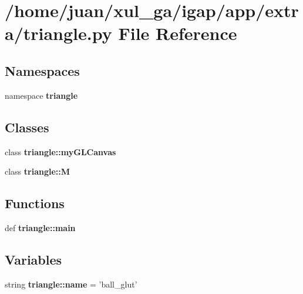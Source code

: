 \section{/home/juan/xul\_\-ga/igap/app/extra/triangle.py File Reference}
\label{triangle_8py}
\subsection*{Namespaces}
\begin{CompactItemize}
\item 
namespace {\bf triangle}
\end{CompactItemize}
\subsection*{Classes}
\begin{CompactItemize}
\item 
class {\bf triangle::myGLCanvas}
\item 
class {\bf triangle::M}
\end{CompactItemize}
\subsection*{Functions}
\begin{CompactItemize}
\item 
def {\bf triangle::main}
\end{CompactItemize}
\subsection*{Variables}
\begin{CompactItemize}
\item 
string {\bf triangle::name} = 'ball\_\-glut'
\end{CompactItemize}
